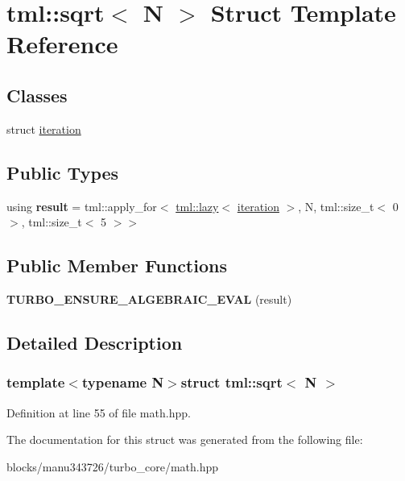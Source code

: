 \hypertarget{structtml_1_1sqrt}{\section{tml\+:\+:sqrt$<$ N $>$ Struct Template Reference}
\label{structtml_1_1sqrt}
}
\subsection*{Classes}
\begin{DoxyCompactItemize}
\item 
struct \hyperlink{structtml_1_1sqrt_1_1iteration}{iteration}
\end{DoxyCompactItemize}
\subsection*{Public Types}
\begin{DoxyCompactItemize}
\item 
\hypertarget{structtml_1_1sqrt_ad31b4715f2ab630d2a65e3cb08778dac}{using {\bfseries result} = tml\+::apply\+\_\+for$<$ \hyperlink{structtml_1_1lazy}{tml\+::lazy}$<$ \hyperlink{structtml_1_1sqrt_1_1iteration}{iteration} $>$, N, tml\+::size\+\_\+t$<$ 0 $>$, tml\+::size\+\_\+t$<$ 5 $>$$>$}\label{structtml_1_1sqrt_ad31b4715f2ab630d2a65e3cb08778dac}

\end{DoxyCompactItemize}
\subsection*{Public Member Functions}
\begin{DoxyCompactItemize}
\item 
\hypertarget{structtml_1_1sqrt_aaf1a9ee217ffd286b029d1077b3d9313}{{\bfseries T\+U\+R\+B\+O\+\_\+\+E\+N\+S\+U\+R\+E\+\_\+\+A\+L\+G\+E\+B\+R\+A\+I\+C\+\_\+\+E\+V\+A\+L} (result)}\label{structtml_1_1sqrt_aaf1a9ee217ffd286b029d1077b3d9313}

\end{DoxyCompactItemize}


\subsection{Detailed Description}
\subsubsection*{template$<$typename N$>$struct tml\+::sqrt$<$ N $>$}



Definition at line 55 of file math.\+hpp.



The documentation for this struct was generated from the following file\+:\begin{DoxyCompactItemize}
\item 
blocks/manu343726/turbo\+\_\+core/math.\+hpp\end{DoxyCompactItemize}
